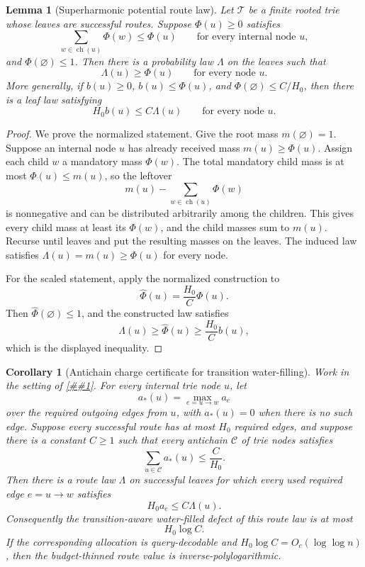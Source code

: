 \documentclass[10pt]{article}
\newcommand{\cref}[1]{\ref{##1}}
\newtheorem{lemma}[theorem]{Lemma}
\newtheorem{corollary}[theorem]{Corollary}
\theoremstyle{definition}
\begin{document}
\begin{lemma}[Superharmonic potential route law]
   \label{lem:superharmonic-potential-route-law}
   Let \(\mathcal T\) be a finite rooted trie whose leaves are successful
   routes.  Suppose \(\Phi(u)\ge0\) satisfies
   \[
      \sum_{w\in\operatorname{ch}(u)}\Phi(w)\le\Phi(u)
      \qquad\text{for every internal node }u,
   \]
   and \(\Phi(\varnothing)\le1\).  Then there is a probability law
   \(\Lambda\) on the leaves such that
   \[
      \Lambda(u)\ge\Phi(u)
      \qquad\text{for every node }u.
   \]
   More generally, if \(b(u)\ge0\), \(b(u)\le\Phi(u)\), and
   \(\Phi(\varnothing)\le C/H_0\), then there is a leaf law satisfying
   \[
      H_0b(u)\le C\Lambda(u)
      \qquad\text{for every node }u.
   \]
\end{lemma}

\begin{proof}
   We prove the normalized statement.  Give the root mass
   \(m(\varnothing)=1\).  Suppose an internal node \(u\) has already received
   mass \(m(u)\ge\Phi(u)\).  Assign each child \(w\) a mandatory mass
   \(\Phi(w)\).  The total mandatory child mass is at most \(\Phi(u)\le m(u)\),
   so the leftover
   \[
      m(u)-\sum_{w\in\operatorname{ch}(u)}\Phi(w)
   \]
   is nonnegative and can be distributed arbitrarily among the children.  This
   gives every child mass at least its \(\Phi(w)\), and the child masses sum to
   \(m(u)\).  Recurse until leaves and put the resulting masses on the leaves.
   The induced law satisfies \(\Lambda(u)=m(u)\ge\Phi(u)\) for every node.

   For the scaled statement, apply the normalized construction to
   \[
      \widehat\Phi(u)=\frac{H_0}{C}\Phi(u).
   \]
   Then \(\widehat\Phi(\varnothing)\le1\), and the constructed law satisfies
   \[
      \Lambda(u)\ge\widehat\Phi(u)
      \ge \frac{H_0}{C}b(u),
   \]
   which is the displayed inequality.
\end{proof}

\begin{corollary}[Antichain charge certificate for transition water-filling]
   \label{cor:antichain-transition-waterfill}
   Work in the setting of \cref{cor:transition-waterfilled-allocation}.  For
   every internal trie node \(u\), let
   \[
      a_*(u)=\max_{e=u\to w}a_e
   \]
   over the required outgoing edges from \(u\), with \(a_*(u)=0\) when there is
   no such edge.  Suppose every successful route has at most \(H_0\) required
   edges, and suppose there is a constant \(C\ge1\) such that every antichain
   \(\mathcal C\) of trie nodes satisfies
   \[
      \sum_{u\in\mathcal C}a_*(u)\le \frac{C}{H_0}.
   \]
   Then there is a route law \(\Lambda\) on successful leaves for which every
   used required edge \(e=u\to w\) satisfies
   \[
      H_0a_e\le C\Lambda(u).
   \]
   Consequently the transition-aware water-filled defect of this route law is
   at most
   \[
      H_0\log C.
   \]
   If the corresponding allocation is query-decodable and
   \(H_0\log C=O_c(\log\log n)\), then the budget-thinned route value is
   inverse-polylogarithmic.
\end{corollary}
\end{document}
